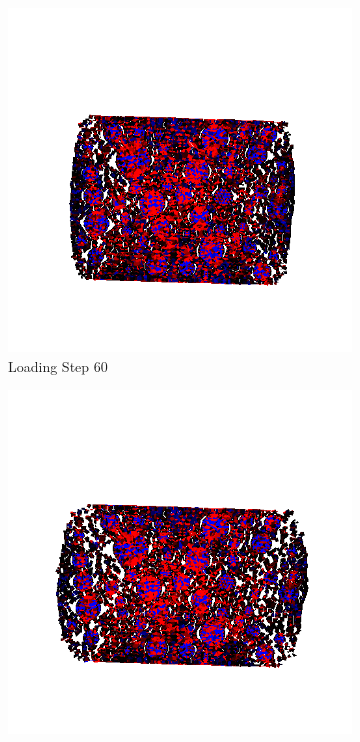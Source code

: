 \begin{figure}[ht]
    \begin{subfigure}{.33\textwidth}
      \centering
      \includegraphics[width=1.0\linewidth]{Files/A30X-5C_3_IS/DEP50-STEP(080).png}
      \caption{Loading Step 60}
    \end{subfigure}%
    \begin{subfigure}{.33\textwidth}
      \centering
      \includegraphics[width=1.0\linewidth]{Files/A30X-5C_3_IS/DEP50-STEP(100).png}

\end{subfigure}
\end{figure}
